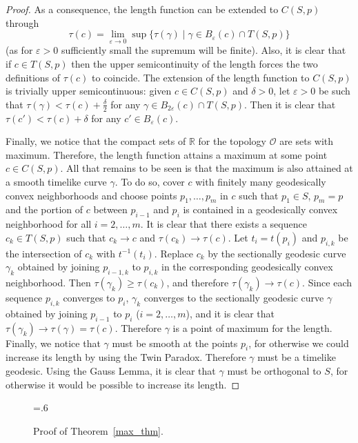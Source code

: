 \documentclass[12pt]{amsart}
\newcommand{\bbR}{\mathbb{R}}      %
\newcommand{\cT}{\mathcal{T}}
\theoremstyle{definition}
\theoremstyle{remark}
\begin{document}
\begin{proof}
As a consequence, the length function can be extended to $C(S,p)$ through
\[
\tau(c)=\lim_{\varepsilon \to 0} \sup\{ \tau(\gamma) \mid \gamma \in B_\varepsilon(c) \cap T(S,p) \}
\]
(as for $\varepsilon>0$ sufficiently small the supremum will be finite). Also, it is clear that if $c \in T(S,p)$ then the upper semicontinuity of the length forces the two definitions of $\tau(c)$ to coincide. The extension of the length function to $C(S,p)$ is trivially upper semicontinuous: given $c \in C(S,p)$ and $\delta > 0$, let $\varepsilon>0$ be such that $\tau(\gamma) < \tau(c) + \frac{\delta}2$ for any $\gamma \in B_{2\varepsilon}(c) \cap T(S,p)$. Then it is clear that $\tau(c') < \tau(c) + \delta$ for any $c' \in B_{\varepsilon}(c)$.

Finally, we notice that the compact sets of $\bbR$ for the topology $\mathcal{O}$ are sets with maximum. Therefore, the length function attains a maximum at some point $c \in C(S,p)$. All that remains to be seen is that the maximum is also attained at a smooth timelike curve $\gamma$. To do so, cover $c$ with finitely many geodesically convex neighborhoods and choose points $p_1, \ldots, p_m$ in $c$ such that $p_1 \in S$, $p_m=p$ and the portion of $c$ between $p_{i-1}$ and $p_{i}$ is contained in a geodesically convex neighborhood for all $i=2, \ldots, m$. It is clear that there exists a sequence $c_k \in T(S,p)$ such that $c_k \to c$ and $\tau(c_k) \to \tau(c)$. Let $t_i=t(p_i)$ and $p_{i,k}$ be the intersection of $c_k$ with $t^{-1}(t_i)$. Replace $c_k$ by the sectionally geodesic curve $\gamma_k$ obtained by joining $p_{i-1,k}$ to $p_{i,k}$ in the corresponding geodesically convex neighborhood. Then $\tau(\gamma_k) \geq \tau(c_k)$, and therefore $\tau(\gamma_k) \to \tau(c)$. Since each sequence $p_{i,k}$ converges to $p_i$, $\gamma_k$ converges to the sectionally geodesic curve $\gamma$ obtained by joining $p_{i-1}$ to $p_{i}$ ($i=2, \ldots, m$), and it is clear that $\tau(\gamma_k) \to \tau(\gamma)=\tau(c)$. Therefore $\gamma$ is a point of maximum for the length. Finally, we notice that $\gamma$ must be smooth at the points $p_i$, for otherwise we could increase its length by using the Twin Paradox. Therefore $\gamma$ must be a timelike geodesic. Using the Gauss Lemma, it is clear that $\gamma$ must be orthogonal to $S$, for otherwise it would be possible to increase its length.
\end{proof}

\begin{figure}[h!]
\begin{center}
\psfrag{u=0}{$\cT=0$}
\psfrag{u=t(c)}{$\cT=\tau(c)$}
\epsfxsize=.6\textwidth
\leavevmode
{}
\end{center}
\caption{Proof of Theorem~\ref{max_thm}.} \label{Figure_semi}
\end{figure}
\end{document}
